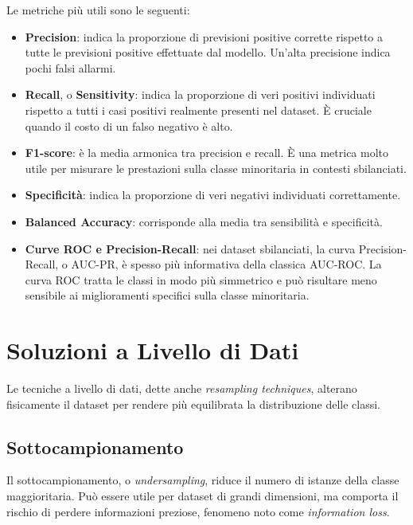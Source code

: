 \documentclass[11pt, a4paper]{article}
\begin{document}
Le metriche più utili sono le seguenti:

\begin{itemize}
    \item \textbf{Precision}: indica la proporzione di previsioni positive
    corrette rispetto a tutte le previsioni positive effettuate dal modello.
    Un'alta precisione indica pochi falsi allarmi.

    \item \textbf{Recall}, o \textbf{Sensitivity}: indica la proporzione di veri
    positivi individuati rispetto a tutti i casi positivi realmente presenti nel
    dataset. È cruciale quando il costo di un falso negativo è alto.

    \item \textbf{F1-score}: è la media armonica tra precision e recall. È una
    metrica molto utile per misurare le prestazioni sulla classe minoritaria in
    contesti sbilanciati.

    \item \textbf{Specificità}: indica la proporzione di veri negativi
    individuati correttamente.

    \item \textbf{Balanced Accuracy}: corrisponde alla media tra sensibilità e
    specificità.

    \item \textbf{Curve ROC e Precision-Recall}: nei dataset sbilanciati, la
    curva Precision-Recall, o AUC-PR, è spesso più informativa della classica
    AUC-ROC. La curva ROC tratta le classi in modo più simmetrico e può risultare
    meno sensibile ai miglioramenti specifici sulla classe minoritaria.
\end{itemize}

\section{Soluzioni a Livello di Dati}

Le tecniche a livello di dati, dette anche \emph{resampling techniques}, alterano
fisicamente il dataset per rendere più equilibrata la distribuzione delle classi.

\subsection{Sottocampionamento}

Il sottocampionamento, o \emph{undersampling}, riduce il numero di istanze della
classe maggioritaria. Può essere utile per dataset di grandi dimensioni, ma
comporta il rischio di perdere informazioni preziose, fenomeno noto come
\emph{information loss}.
\end{document}
